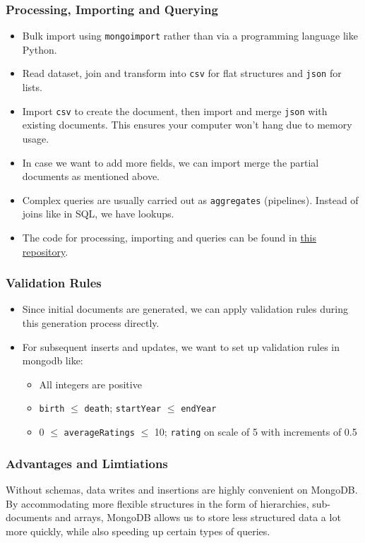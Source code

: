 \documentclass[10pt,titlepage]{article}
\begin{document}
\subsubsection{Processing, Importing and Querying}
\begin{itemize}
    \item Bulk import using \texttt{mongoimport} rather than via a programming language like Python.
    \item Read dataset, join and transform into \texttt{csv} for flat structures and \texttt{json} for lists.
    \item Import \texttt{csv} to create the document, then import and merge \texttt{json} with existing documents. This
        ensures your computer won't hang due to memory usage.
    \item In case we want to add more fields, we can import merge the partial documents as mentioned above.
    \item Complex queries are usually carried out as \texttt{aggregates} (pipelines). Instead of joins like in SQL, we
        have lookups.
    \item The code for processing, importing and queries can be found in \href{https://github.com/recurze/MiniMovieDB}{this repository}.

\end{itemize}

\subsubsection{Validation Rules}
\begin{itemize}
    \item Since initial documents are generated, we can apply validation rules during this generation process directly.
    \item For subsequent inserts and updates, we want to set up validation rules in mongodb like:
        \begin{itemize}
            \item All integers are positive
            \item \texttt{birth} $\le$ \texttt{death}; \texttt{startYear} $\le$ \texttt{endYear}
            \item 0 $\le$ \texttt{averageRatings} $\le$ 10; \texttt{rating} on scale of 5 with increments
                of 0.5
        \end{itemize}
\end{itemize}

\subsubsection{Advantages and Limtiations}
Without schemas, data writes and insertions are highly convenient on MongoDB. By accommodating more flexible structures in the form of hierarchies, sub-documents and arrays, MongoDB allows us to store less structured data a lot more quickly, while also speeding up certain types of queries.
\end{document}
